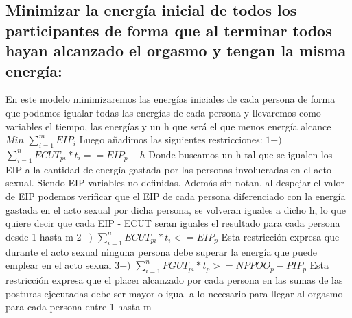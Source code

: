 \documentclass{llncs}
\begin{document}
\subsection{Minimizar la energía inicial de todos los participantes de forma que al terminar todos hayan alcanzado el orgasmo y tengan la misma energía:}
En este modelo minimizaremos las energías iniciales de cada persona de forma que podamos igualar todas las energías de cada persona y llevaremos como variables el tiempo, las energías y un h que será el que menos energía alcance
\newline
\newline
$Min$ $\sum_{i=1}^{m} EIP_{i}$
\newline
\newline
Luego añadimos las siguientes restricciones:
\newline
\newline
$1-)$ $\sum_{i=1}^{n} ECUT_{pi}*t_{i} == EIP_{p} - h$
\newline
\newline
Donde buscamos un h tal que se igualen los EIP a la cantidad de energía gastada por las personas involucradas en el acto sexual. Siendo EIP variables no definidas. Además sin notan, al despejar el valor de EIP podemos verificar que el EIP de cada persona diferenciado con la energía gastada en el acto sexual por dicha persona, se volveran iguales a dicho h, lo que quiere decir que cada EIP - ECUT seran iguales el resultado para cada persona desde 1 hasta m
\newline
\newline
$2-)$ $\sum_{i = 1}^{n} ECUT_{pi}*t_{i} <= EIP_{p}$
\newline
\newline
Esta restricción expresa que durante el acto sexual ninguna persona debe superar la energía que puede emplear en el acto sexual
\newline
\newline
$3-)$ $\sum_{i = 1}^{n} PGUT_{pi}*t_{p} >= NPPOO_{p} - PIP_{p}$
\newline
\newline
Esta restricción expresa que el placer alcanzado por cada persona en las sumas de las posturas ejecutadas debe ser mayor o igual a lo necesario para llegar al orgasmo para cada persona entre 1 hasta m
\end{document}
